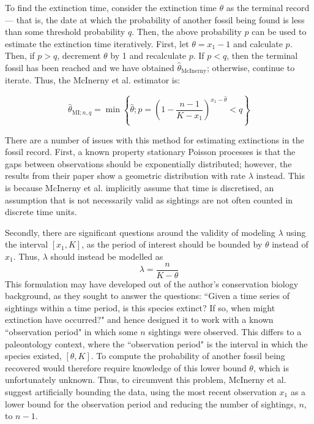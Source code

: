 To find the extinction time, consider the extinction time $\theta$ as the terminal record --- that is, the date at which the probability of another fossil being found is less than some threshold probability $q$. Then, the above probability $p$ can be used to estimate the extinction time iteratively. First, let $\theta = x_1 - 1$ and calculate $p$. Then, if $p > q$, decrement $\theta$ by 1 and recalculate $p$. If $p < q$, then the terminal fossil has been reached and we have obtained $\hat\theta_{\text{McInerny}}$; otherwise, continue to iterate. Thus, the McInerny et al. estimator is:

\begin{equation}
    \hat\theta_{\text{MI}; n, q} = \min\left\{ \hat\theta ; p = \left( 1 - \frac{n-1}{K - x_1} \right)^{x_1 - \hat\theta} < q \right\}
\end{equation}

There are a number of issues with this method for estimating extinctions in the fossil record. First, a known property stationary Poisson processes is that the gaps between observations should be exponentially distributed; however, the results from their paper show a geometric distribution with rate $\lambda$ instead. This is because McInerny et al. implicitly assume that time is discretised, an assumption that is not necessarily valid as sightings are not often counted in discrete time units.

Secondly, there are significant questions around the validity of modeling $\lambda$ using the interval $[x_1, K]$, as the period of interest should be bounded by $\theta$ instead of $x_1$. Thus, $\lambda$ should instead be modelled as \[ \lambda = \frac{n}{K - \theta} \] This formulation may have developed out of the author's conservation biology background, as they sought to answer the questions: ``Given a time series of sightings within a time period, is this species extinct? If so, when might extinction have occurred?" and hence designed it to work with a known ``observation period" in which some $n$ sightings were observed. This differs to a paleontology context, where the ``observation period" is the interval in which the species existed, $[\theta, K]$. To compute the probability of another fossil being recovered would therefore require knowledge of this lower bound $\theta$, which is unfortunately unknown. Thus, to circumvent this problem, McInerny et al. suggest artificially bounding the data, using the most recent observation $x_1$ as a lower bound for the observation period and reducing the number of sightings, $n$, to $n-1$. 

